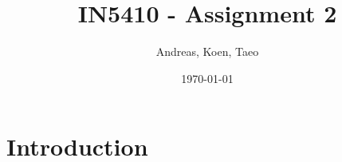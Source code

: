 \documentclass{article}
\title{IN5410 - Assignment 2}
\author{Andreas, Koen, Taeo}
\date{\today}
\begin{document}
\maketitle

\section{Introduction}
\end{document}
